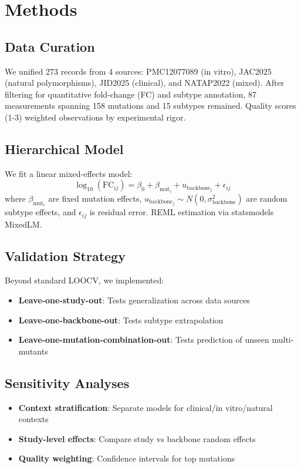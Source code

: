 \documentclass[11pt]{article}
\begin{document}
\section{Methods}

\subsection{Data Curation}
We unified 273 records from 4 sources: PMC12077089 (in vitro), JAC2025 (natural polymorphisms), JID2025 (clinical), and NATAP2022 (mixed). After filtering for quantitative fold-change (FC) and subtype annotation, 87 measurements spanning 158 mutations and 15 subtypes remained. Quality scores (1-3) weighted observations by experimental rigor.

\subsection{Hierarchical Model}
We fit a linear mixed-effects model:
\begin{equation}
\log_{10}(\text{FC}_{ij}) = \beta_0 + \beta_{\text{mut}_i} + u_{\text{backbone}_j} + \epsilon_{ij}
\end{equation}
where $\beta_{\text{mut}_i}$ are fixed mutation effects, $u_{\text{backbone}_j} \sim N(0, \sigma^2_{\text{backbone}})$ are random subtype effects, and $\epsilon_{ij}$ is residual error. REML estimation via statsmodels MixedLM.

\subsection{Validation Strategy}
Beyond standard LOOCV, we implemented:
\begin{itemize}
\item \textbf{Leave-one-study-out}: Tests generalization across data sources
\item \textbf{Leave-one-backbone-out}: Tests subtype extrapolation
\item \textbf{Leave-one-mutation-combination-out}: Tests prediction of unseen multi-mutants
\end{itemize}

\subsection{Sensitivity Analyses}
\begin{itemize}
\item \textbf{Context stratification}: Separate models for clinical/in vitro/natural contexts
\item \textbf{Study-level effects}: Compare study vs backbone random effects
\item \textbf{Quality weighting}: Confidence intervals for top mutations
\end{itemize}
\end{document}
